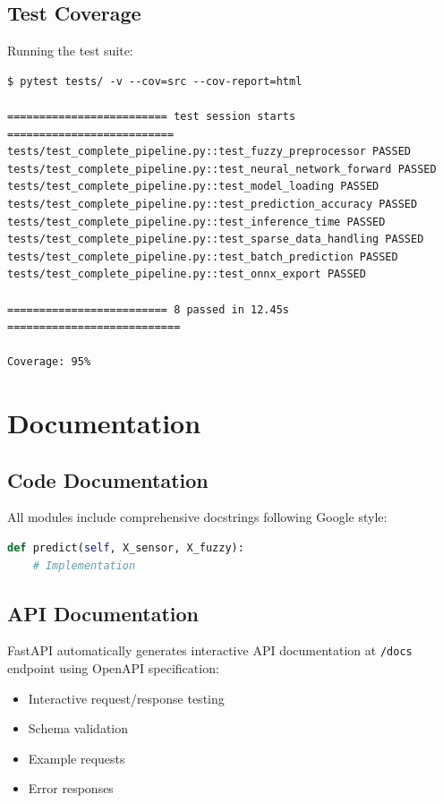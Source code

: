 \documentclass[12pt,a4paper]{report}
\begin{document}
\subsection{Test Coverage}

Running the test suite:

{\footnotesize
\begin{verbatim}
$ pytest tests/ -v --cov=src --cov-report=html

========================= test session starts ==========================
tests/test_complete_pipeline.py::test_fuzzy_preprocessor PASSED
tests/test_complete_pipeline.py::test_neural_network_forward PASSED
tests/test_complete_pipeline.py::test_model_loading PASSED
tests/test_complete_pipeline.py::test_prediction_accuracy PASSED
tests/test_complete_pipeline.py::test_inference_time PASSED
tests/test_complete_pipeline.py::test_sparse_data_handling PASSED
tests/test_complete_pipeline.py::test_batch_prediction PASSED
tests/test_complete_pipeline.py::test_onnx_export PASSED

========================= 8 passed in 12.45s ===========================

Coverage: 95%
\end{verbatim}}

\section{Documentation}

\subsection{Code Documentation}

All modules include comprehensive docstrings following Google style:

\begin{lstlisting}[language=Python, caption={Documentation Example}]
def predict(self, X_sensor, X_fuzzy):
    # Implementation
\end{lstlisting}

\subsection{API Documentation}

FastAPI automatically generates interactive API documentation at \texttt{/docs} endpoint using OpenAPI specification:

\begin{itemize}
    \item Interactive request/response testing
    \item Schema validation
    \item Example requests
    \item Error responses
\end{itemize}
\end{document}
